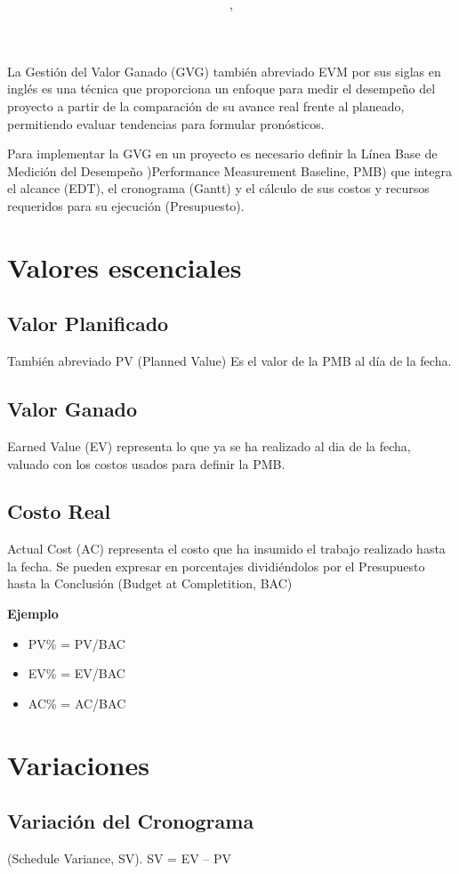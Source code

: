 \documentclass{article}
\author{\nombre , \carnet}
\title{\textbf{\Huge\titulo}}
\newcommand*\rbreak{\par\noindent\linebreak}
\begin{document}
\maketitle
La Gestión del Valor Ganado (GVG) también abreviado EVM por sus siglas en inglés es una técnica 
que proporciona un enfoque para medir el desempeño del proyecto a partir de la comparación de su avance 
real frente al planeado, permitiendo evaluar tendencias para formular pronósticos.\rbreak
Para implementar la GVG en un proyecto es necesario definir la Línea Base de Medición del Desempeño 
)Performance Measurement Baseline, PMB) que integra el alcance (EDT), el cronograma (Gantt) y el cálculo de sus costos 
y recursos requeridos para su ejecución (Presupuesto).
\section{Valores escenciales}
\subsection{Valor Planificado}
También abreviado PV (Planned Value) Es el valor de la PMB al día de la fecha.
\subsection{Valor Ganado}
Earned Value (EV) representa lo que ya se ha realizado al dia de la fecha, valuado 
con los costos usados para definir la PMB.
\subsection{Costo Real}
Actual Cost (AC) representa el costo que ha insumido el trabajo realizado hasta la fecha.
Se pueden expresar en porcentajes dividiéndolos por el Presupuesto hasta la Conclusión (Budget at Completition, BAC) \rbreak
\bfseries{Ejemplo}\rbreak
\begin{itemize}
                \item PV\% = PV/BAC
                \item EV\% = EV/BAC
                \item AC\% = AC/BAC    
\end{itemize}
                \section{Variaciones}
                \subsection{Variación del Cronograma}
                (Schedule Variance, SV). SV = EV – PV
\end{document}
